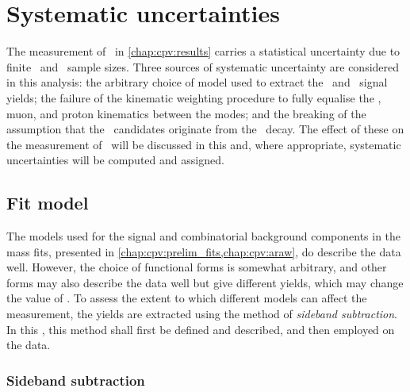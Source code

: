 \chapter{Systematic uncertainties}
\label{chap:cpv:syst}

The measurement of \dACP\ in \cref{chap:cpv:results} carries a statistical 
uncertainty due to finite \pKK\ and \ppipi\ sample sizes.
Three sources of systematic uncertainty are considered in this analysis: the 
arbitrary choice of model used to extract the \PLambdac\ and \APLambdac\ signal 
yields; the failure of the kinematic weighting procedure to fully equalise the 
\PLambdab, muon, and proton kinematics between the modes; and the breaking of 
the assumption that the \PLambdac\ candidates originate from the \LbToLcmuX\ 
decay.
The effect of these on the measurement of \dACP\ will be discussed in this 
\namecref{chap:cpv:syst} and, where appropriate, systematic uncertainties will 
be computed and assigned.

\section{Fit model}
\label{chap:cpv:syst:fit}

The models used for the signal and combinatorial background components in the 
mass fits, presented in \cref{chap:cpv:prelim_fits,chap:cpv:araw}, do describe 
the data well.
However, the choice of functional forms is somewhat arbitrary, and other forms 
may also describe the data well but give different yields, which may change the 
value of \dACP\@.
To assess the extent to which different models can affect the measurement, the 
yields are extracted using the method of \emph{sideband subtraction}.
In this \namecref{chap:cpv:syst:fit}, this method shall first be defined and 
described, and then employed on the data.

\subsection{Sideband subtraction}
\label{chap:cpv:syst:fit:sb}

